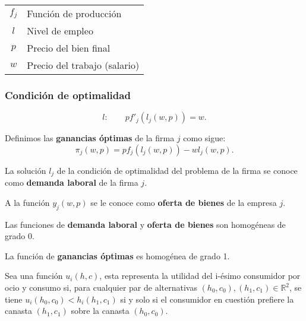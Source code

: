 \documentclass[8pt,a4paper]{extarticle}
\begin{document}
\begin{multicols}{3}
\begin{center}
\begin{tabular}{ c l }
	\hline
	$f_j$ & Función de producción \\
	$l$   & Nivel de empleo \\
	$p$   & Precio del bien final \\
	$w$   & Precio del trabajo (salario) \\
	\hline
\end{tabular}
\end{center}

\subsubsection*{Condición de optimalidad}

\[
	l : \qquad pf'_j(l_j(w, p)) = w
.\] 

\begin{boxdef}
	Definimos las \textbf{ganancias óptimas} de la firma $j$ como sigue:
	\[
		\pi_j(w, p) = pf_j(l_j(w, p)) - wl_j(w, p)
	.\] 
\end{boxdef}

\begin{boxdef}
	La solución $l_j$ de la condición de optimalidad del problema de la firma se conoce como \textbf{demanda laboral} de la firma $j$.
\end{boxdef}

\begin{boxdef}
	A la función $y_j(w, p)$ se le conoce como \textbf{oferta de bienes} de la empresa $j$.
\end{boxdef}

\begin{boxprop}
	Las funciones de \textbf{demanda laboral} y \textbf{oferta de bienes}  son homogéneas de grado 0.
\end{boxprop}

\begin{boxprop}
	La función de \textbf{ganancias óptimas} es homogénea de grado 1.
\end{boxprop}

\begin{boxdef}
	Sea una función $u_i(h, c)$, esta representa la utilidad del i-ésimo  consumidor por ocio y consumo si, para cualquier par de alternativas $(h_0, c_0), (h_1, c_1) \in \mathbb{R}^2$, se tiene $u_i(h_0, c_0) < h_i(h_1, c_1)$ si y solo si  el consumidor en cuestión prefiere la canasta $(h_1, c_1)$ sobre la canasta $(h_0, c_0)$.
\end{boxdef}


\end{multicols}
\end{document}
